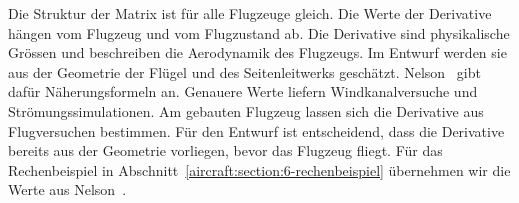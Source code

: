Die Struktur der Matrix ist für alle Flugzeuge gleich.
Die Werte der Derivative hängen vom Flugzeug und vom Flugzustand ab.
Die Derivative sind physikalische Grössen und beschreiben die Aerodynamik
des Flugzeugs.
%
Im Entwurf werden sie aus der Geometrie der Flügel und des Seitenleitwerks
geschätzt.
Nelson~\cite[Kapitel 3]{aircraft:nelson} gibt dafür Näherungsformeln an.
Genauere Werte liefern Windkanalversuche und Strömungssimulationen.
%
%
Am gebauten Flugzeug lassen sich die Derivative aus Flugversuchen bestimmen.
%
Für den Entwurf ist entscheidend, dass die Derivative bereits aus der Geometrie
vorliegen, bevor das Flugzeug fliegt.
Für das Rechenbeispiel in Abschnitt~\ref{aircraft:section:6-rechenbeispiel}
übernehmen wir die Werte aus Nelson~\cite[Tabelle 5.2]{aircraft:nelson}.

